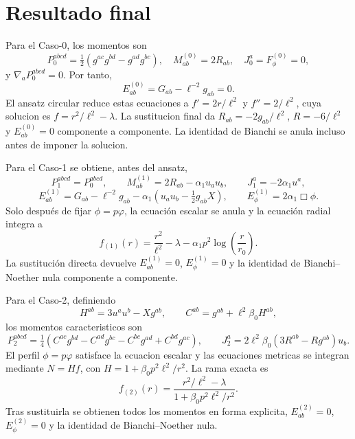 \documentclass[11pt,a4paper]{article}
\begin{document}
\section{Resultado final}
Para el Caso-0, los momentos son
\[
P_0^{abcd}=\tfrac12(g^{ac}g^{bd}-g^{ad}g^{bc}),\quad
M^{(0)}_{ab}=2R_{ab},\quad J_0^a=F_\phi^{(0)}=0,
\]
y $\nabla_aP_0^{abcd}=0$. Por tanto,
\[
E^{(0)}_{ab}=G_{ab}-\ell^{-2}g_{ab}=0.
\]
El ansatz circular reduce estas ecuaciones a $f'=2r/\ell^2$ y
$f''=2/\ell^2$, cuya solucion es $f=r^2/\ell^2-\lambda$. La sustitucion final
da $R_{ab}=-2g_{ab}/\ell^2$, $R=-6/\ell^2$ y $E^{(0)}_{ab}=0$ componente a
componente. La identidad de Bianchi se anula incluso antes de imponer la solucion.

Para el Caso-1 se obtiene, antes del ansatz,
\[
P_1^{abcd}=P_0^{abcd},\qquad
M^{(1)}_{ab}=2R_{ab}-\alpha_1u_au_b,\qquad
J_1^a=-2\alpha_1u^a,
\]
\[
E^{(1)}_{ab}=G_{ab}-\ell^{-2}g_{ab}
-\alpha_1\left(u_au_b-\tfrac12g_{ab}X\right),
\qquad E^{(1)}_\phi=2\alpha_1\Box\phi.
\]
Solo después de fijar $\phi=p\varphi$, la ecuación escalar se anula y la ecuación
radial integra a
\[
f_{(1)}(r)=\frac{r^2}{\ell^2}-\lambda
-\alpha_1p^2\log\left(\frac r{r_0}\right).
\]
La sustitución directa devuelve $E^{(1)}_{ab}=0$, $E^{(1)}_\phi=0$ y la identidad
de Bianchi--Noether nula componente a componente.

Para el Caso-2, definiendo
\[
H^{ab}=3u^au^b-Xg^{ab},\qquad
C^{ab}=g^{ab}+\ell^2\beta_0H^{ab},
\]
los momentos caracteristicos son
\[
P_2^{abcd}=\tfrac14(C^{ac}g^{bd}-C^{ad}g^{bc}-C^{bc}g^{ad}+C^{bd}g^{ac}),
\qquad
J_2^a=2\ell^2\beta_0(3R^{ab}-Rg^{ab})u_b.
\]
El perfil $\phi=p\varphi$ satisface la ecuacion escalar y las ecuaciones metricas
se integran mediante $N=Hf$, con $H=1+\beta_0p^2\ell^2/r^2$. La rama exacta es
\[
f_{(2)}(r)=\frac{r^2/\ell^2-\lambda}
{1+\beta_0p^2\ell^2/r^2}.
\]
Tras sustituirla se obtienen todos los momentos en forma explicita,
$E^{(2)}_{ab}=0$, $E^{(2)}_\phi=0$ y la identidad de Bianchi--Noether nula.
\end{document}
